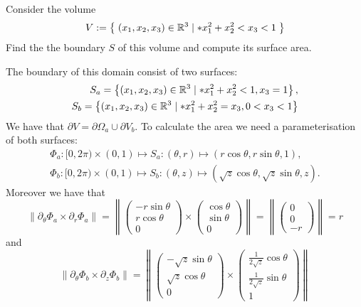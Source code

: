 \documentclass[11pt]{article}
\begin{document}
\begin{exercise}
    Consider the volume  
    \begin{gather*}
        V := \left\{\; (x_1,x_2,x_3) \in \mathbb R^3 \suchthat* x_1^2 + x_2^2 < x_3 < 1 \;\right\}
    \end{gather*}
    Find the the boundary $S$ of this volume and compute its surface area. 
\end{exercise}
\begin{solution} 
    The boundary of this domain consist of two surfaces:
    \begin{align*}
        S_a =\left\{ (x_1,x_2,x_3) \in \mathbb R^3 \suchthat* x_1^2 + x_2^2 < 1, x_3 = 1 \right\} 
        ,
        \\
        S_b =\left\{ (x_1,x_2,x_3) \in \mathbb R^3 \suchthat* x_1^2 + x_2^2 = x_3, 0<x_3<1 \right\} 
    \end{align*}
    We have that $\partial V = \partial \Omega_a \cup \partial V_b$. 
    To calculate the area we need a parameterisation of both surfaces:
    \begin{align*}
        \Phi_a: [0,2\pi) \times (0,1) \mapsto S_a: (\theta,r)\mapsto (r\cos\theta, r\sin\theta,1),
        \\
        \Phi_b: [0,2\pi) \times (0,1) \mapsto S_b: (\theta,z)\mapsto (\sqrt{z}\cos\theta, \sqrt{z}\sin\theta,z).
    \end{align*}
    Moreover we have that
    \[
        \left\|\partial_{\theta}\Phi_{a}\times \partial_r\Phi_{a}\right\| 
        = 
        \left\|\begin{pmatrix} -r\sin\theta \\ r\cos\theta\\0 \end{pmatrix} \times \begin{pmatrix} \cos\theta \\ \sin\theta \\0 \end{pmatrix}\right\| 
        = 
        \left\|\begin{pmatrix} 0 \\ 0 \\ -r \end{pmatrix}\right\| 
        = 
        r
    \]
    and 
    \[
        \left\|\partial_{\theta}\Phi_{b}\times \partial_z\Phi_{b}\right\|  
        = 
        \left\|\begin{pmatrix} -\sqrt{z}\sin\theta \\ \sqrt{z}\cos\theta\\0 \end{pmatrix} \times \begin{pmatrix} \frac{1}{2\sqrt{z}}\cos\theta \\  \frac{1}{2\sqrt{z}}\sin\theta \\1 \end{pmatrix}\right\| 
\]
\end{solution}
\end{document}

